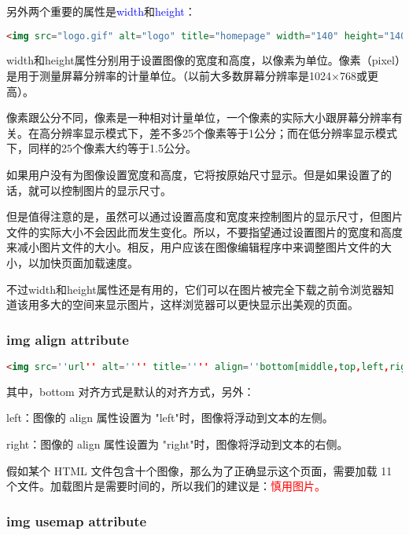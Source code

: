 另外两个重要的属性是\textcolor{Blue}{width}和\textcolor{Blue}{height}：

\begin{lstlisting}[language=HTML]
	<img src="logo.gif" alt="logo" title="homepage" width="140" height="140">
\end{lstlisting}

width和height属性分别用于设置图像的宽度和高度，以像素为单位。像素（pixel）是用于测量屏幕分辨率的计量单位。（以前大多数屏幕分辨率是1024×768或更高）。

像素跟公分不同，像素是一种相对计量单位，一个像素的实际大小跟屏幕分辨率有关。在高分辨率显示模式下，差不多25个像素等于1公分；而在低分辨率显示模式下，同样的25个像素大约等于1.5公分。

如果用户没有为图像设置宽度和高度，它将按原始尺寸显示。但是如果设置了的话，就可以控制图片的显示尺寸。

但是值得注意的是，虽然可以通过设置高度和宽度来控制图片的显示尺寸，但图片文件的实际大小不会因此而发生变化。所以，不要指望通过设置图片的宽度和高度来减小图片文件的大小。相反，用户应该在图像编辑程序中来调整图片文件的大小，以加快页面加载速度。

不过width和height属性还是有用的，它们可以在图片被完全下载之前令浏览器知道该用多大的空间来显示图片，这样浏览器可以更快显示出美观的页面。

\subsubsection{img align attribute}

\begin{lstlisting}[language=HTML]
	<img src=''url'' alt='''' title='''' align=''bottom[middle,top,left,right]''>
\end{lstlisting}

其中，bottom 对齐方式是默认的对齐方式，另外：

\begin{compactitem}
\item left：图像的 align 属性设置为 "left"时，图像将浮动到文本的左侧。
\item right：图像的 align 属性设置为 "right"时，图像将浮动到文本的右侧。
\end{compactitem}




假如某个 HTML 文件包含十个图像，那么为了正确显示这个页面，需要加载 11 个文件。加载图片是需要时间的，所以我们的建议是：\textcolor{Red}{慎用图片。}

\subsubsection{img usemap attribute}

